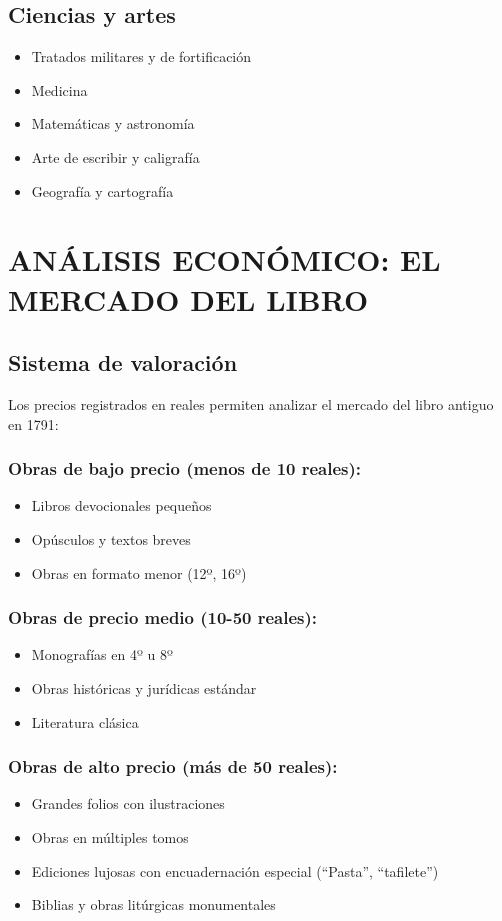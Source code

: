 \documentclass[12pt,a4paper]{article}
\begin{document}
\subsection{Ciencias y artes}

\begin{itemize}
    \item Tratados militares y de fortificación
    \item Medicina
    \item Matemáticas y astronomía
    \item Arte de escribir y caligrafía
    \item Geografía y cartografía
\end{itemize}

\section{ANÁLISIS ECONÓMICO: EL MERCADO DEL LIBRO}

\subsection{Sistema de valoración}

Los precios registrados en reales permiten analizar el mercado del libro antiguo en 1791:

\subsubsection*{Obras de bajo precio (menos de 10 reales):}
\begin{itemize}
    \item Libros devocionales pequeños
    \item Opúsculos y textos breves
    \item Obras en formato menor (12º, 16º)
\end{itemize}

\subsubsection*{Obras de precio medio (10-50 reales):}
\begin{itemize}
    \item Monografías en 4º u 8º
    \item Obras históricas y jurídicas estándar
    \item Literatura clásica
\end{itemize}

\subsubsection*{Obras de alto precio (más de 50 reales):}
\begin{itemize}
    \item Grandes folios con ilustraciones
    \item Obras en múltiples tomos
    \item Ediciones lujosas con encuadernación especial (``Pasta'', ``tafilete'')
    \item Biblias y obras litúrgicas monumentales
\end{itemize}
\end{document}
